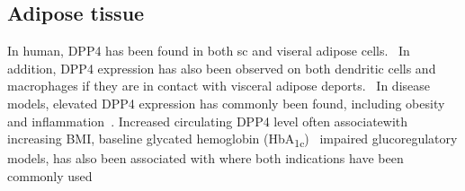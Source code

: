 \subsection{Adipose tissue}
In human, DPP4 has been found in both sc and viseral adipose cells.~\cite{Lamers2011} In addition, DPP4 expression has also been observed on both dendritic cells and macrophages if they are in contact with visceral adipose deports.~\cite{Zhong2013} In disease models, elevated DPP4 expression has commonly been found, including obesity and inflammation~\cite{Zhong2013}. Increased circulating DPP4 level often associatewith increasing BMI, baseline glycated hemoglobin (HbA\textsubscript{1c})~\cite{2011}  impaired glucoregulatory models,  has also been associated with where both indications have been commonly used 